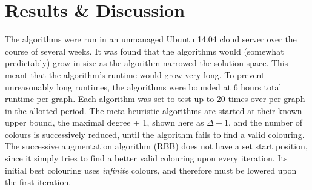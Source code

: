\chapter{Results \& Discussion}

The algorithms were run in an unmanaged Ubuntu 14.04 cloud server over the course of several weeks. It was found that the algorithms would (somewhat predictably) grow in size as the algorithm narrowed the solution space. This meant that the algorithm's runtime would grow very long. To prevent unreasonably long runtimes, the algorithms were bounded at 6 hours total runtime per graph. Each algorithm was set to test up to 20 times over per graph in the allotted period. The meta-heuristic algorithms are started at their known upper bound, the maximal degree + 1, shown here as $\Delta + 1$, and the number of colours is successively reduced, until the algorithm fails to find a valid colouring.  The successive augmentation algorithm (RBB) does not have a set start position, since it simply tries to find a better valid colouring upon every iteration. Its initial best colouring uses \emph{infinite} colours, and therefore must be lowered upon the first iteration.

